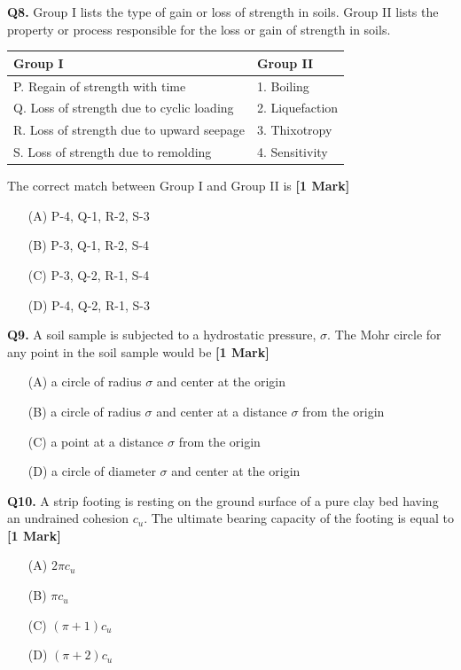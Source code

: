 \documentclass[11pt]{article}
\newcommand{\questiona}[2]{
    \noindent\textbf{Q#2.} #1 \hfill \textbf{[1 Mark]}
}
\begin{document}
\questiona{Group I lists the type of gain or loss of strength in soils. Group II lists the property or process responsible for the loss or gain of strength in soils.

\begin{tabular}{|l|l|}
\hline
Group I & Group II \\
\hline
P. Regain of strength with time & 1. Boiling \\
Q. Loss of strength due to cyclic loading & 2. Liquefaction \\
R. Loss of strength due to upward seepage & 3. Thixotropy \\
S. Loss of strength due to remolding & 4. Sensitivity \\
\hline
\end{tabular}

The correct match between Group I and Group II is}{8}
\begin{enumerate}
    \item[(A)] P-4, Q-1, R-2, S-3
    \item[(B)] P-3, Q-1, R-2, S-4
    \item[(C)] P-3, Q-2, R-1, S-4
    \item[(D)] P-4, Q-2, R-1, S-3
\end{enumerate}

\vspace{0.5cm}

\questiona{A soil sample is subjected to a hydrostatic pressure, $\sigma$. The Mohr circle for any point in the soil sample would be}{9}
\begin{enumerate}
    \item[(A)] a circle of radius $\sigma$ and center at the origin
    \item[(B)] a circle of radius $\sigma$ and center at a distance $\sigma$ from the origin
    \item[(C)] a point at a distance $\sigma$ from the origin
    \item[(D)] a circle of diameter $\sigma$ and center at the origin
\end{enumerate}

\vspace{0.5cm}

\questiona{A strip footing is resting on the ground surface of a pure clay bed having an undrained cohesion $c_{u}$. The ultimate bearing capacity of the footing is equal to}{10}
\begin{enumerate}
    \item[(A)] $2\pi c_{u}$
    \item[(B)] $\pi c_{u}$
    \item[(C)] $(\pi+1) c_{u}$
    \item[(D)] $(\pi+2) c_{u}$
\end{enumerate}
\end{document}
